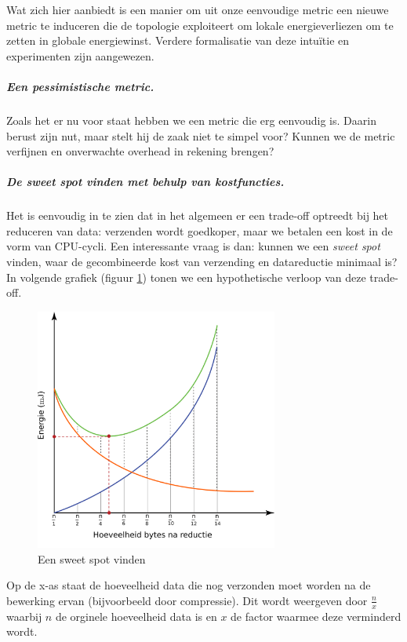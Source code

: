 \documentclass[11pt]{article}
\begin{document}
Wat zich hier aanbiedt is een manier om uit onze eenvoudige metric een nieuwe
metric te induceren die de topologie exploiteert om lokale energieverliezen om
te zetten in globale energiewinst. Verdere formalisatie van deze intu\"itie en
experimenten zijn aangewezen.

\subparagraph{Een pessimistische metric.}

Zoals het er nu voor staat hebben we een metric die erg eenvoudig is. Daarin
berust zijn nut, maar stelt hij de zaak niet te simpel voor? Kunnen we de metric
verfijnen en onverwachte overhead in rekening brengen? 


\subparagraph{De \textit{sweet spot} vinden met behulp van kostfuncties.}

Het is eenvoudig in te zien dat in het algemeen er een trade-off optreedt
bij het reduceren van data: verzenden wordt goedkoper, maar we betalen een kost
in de vorm van CPU-cycli. Een interessante vraag is dan: kunnen we een
\textit{sweet spot} vinden, waar de gecombineerde kost van verzending en
datareductie minimaal is?
\\
In volgende grafiek (figuur \ref{fig:sweet_spot}) tonen we een hypothetische
verloop van deze trade-off.

\begin{figure}[h]
\centering
\includegraphics[width=8cm]{sweetspot}
\caption{Een sweet spot vinden}
\label{fig:sweet_spot}
\end{figure}

Op de x-as staat de hoeveelheid data die nog verzonden moet worden na de bewerking ervan (bijvoorbeeld door compressie). Dit wordt weergeven door $\frac{n}{x}$ waarbij $n$ de orginele hoeveelheid data is en $x$ de factor waarmee deze verminderd wordt. 
\end{document}
